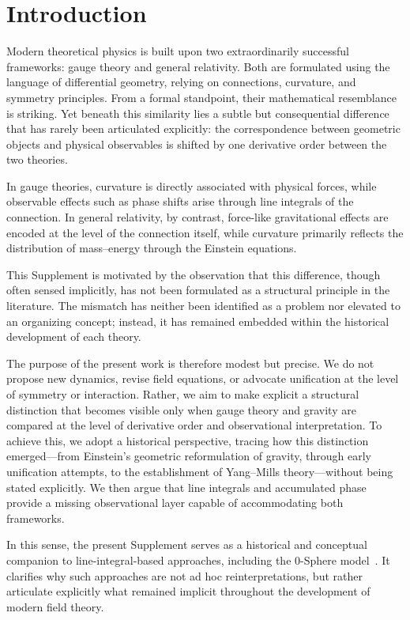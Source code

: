 \documentclass[12pt,letterpaper]{article}
\begin{document}
\section{Introduction}

\justifying
Modern theoretical physics is built upon two extraordinarily successful frameworks: gauge theory and general relativity. Both are formulated using the language of differential geometry, relying on connections, curvature, and symmetry principles. From a formal standpoint, their mathematical resemblance is striking. Yet beneath this similarity lies a subtle but consequential difference that has rarely been articulated explicitly: the correspondence between geometric objects and physical observables is shifted by one derivative order between the two theories.

In gauge theories, curvature is directly associated with physical forces, while observable effects such as phase shifts arise through line integrals of the connection. In general relativity, by contrast, force-like gravitational effects are encoded at the level of the connection itself, while curvature primarily reflects the distribution of mass--energy through the Einstein equations.

This Supplement is motivated by the observation that this difference, though often sensed implicitly, has not been formulated as a structural principle in the literature. The mismatch has neither been identified as a problem nor elevated to an organizing concept; instead, it has remained embedded within the historical development of each theory.

The purpose of the present work is therefore modest but precise. We do not propose new dynamics, revise field equations, or advocate unification at the level of symmetry or interaction. Rather, we aim to make explicit a structural distinction that becomes visible only when gauge theory and gravity are compared at the level of derivative order and observational interpretation. To achieve this, we adopt a historical perspective, tracing how this distinction emerged---from Einstein's geometric reformulation of gravity, through early unification attempts, to the establishment of Yang--Mills theory---without being stated explicitly. We then argue that line integrals and accumulated phase provide a missing observational layer capable of accommodating both frameworks.

In this sense, the present Supplement serves as a historical and conceptual companion to line-integral-based approaches, including the 0-Sphere model~\cite{hanamura18067760,hanamura18135855,hanamura18203433}. It clarifies why such approaches are not ad hoc reinterpretations, but rather articulate explicitly what remained implicit throughout the development of modern field theory.
\end{document}
